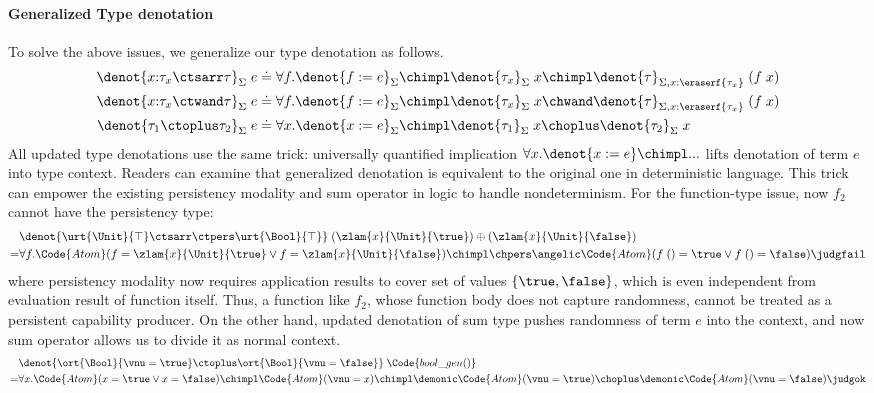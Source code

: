 \paragraph{Generalized Type denotation} To solve the above issues, we generalize our type denotation as follows.
\begin{align*}
  \denot{x{:}\tau_x \ctsarr \tau}_\Sigma\;e &\doteq \forall f. \denot{f := e}_\Sigma \chimpl \denot{\tau_x}_\Sigma\;x \chimpl \denot{\tau}_{\Sigma,x{:}\eraserf{\tau_x}}\;(f\;x)
  \\\denot{x{:}\tau_x \ctwand \tau}_\Sigma\;e &\doteq \forall f. \denot{f := e}_\Sigma \chimpl \denot{\tau_x}_\Sigma\;x \chwand \denot{\tau}_{\Sigma,x{:}\eraserf{\tau_x}}\;(f\;x)
  \\\denot{\tau_1 \ctoplus \tau_2}_\Sigma\;e &\doteq \forall x. \denot{x := e}_\Sigma \chimpl \denot{\tau_1}_\Sigma\;x \choplus \denot{\tau_2}_\Sigma\;x
\end{align*}\noindent
All updated type denotations use the same trick: universally quantified implication $\forall x. \denot{x := e} \chimpl ...$ lifts denotation of term $e$ into type context. Readers can examine that generalized denotation is equivalent to the original one in deterministic language.
This trick can empower the existing persistency modality and sum operator in logic to handle nondeterminism.
For the function-type issue, now $f_2$ cannot have the persistency type:
\begin{align*}
  &\denot{\urt{\Unit}{\top}\ctsarr\ctpers\urt{\Bool}{\top}}\;(\zlam{x}{\Unit}{\true}) \oplus (\zlam{x}{\Unit}{\false})
  \\=& \forall f. \Code{Atom}(f = \zlam{x}{\Unit}{\true} \lor f = \zlam{x}{\Unit}{\false}) \chimpl \chpers \angelic \Code{Atom}(f\;() = \true \lor f\;() = \false) \judgfail
\end{align*}\noindent
where persistency modality now requires application results to cover set of values $\{\true, \false\}$, which is even independent from evaluation result of function itself. Thus, a function like $f_2$, whose function body does not capture randomness, cannot be treated as a persistent capability producer. On the other hand, updated denotation of sum type pushes randomness of term $e$ into the context, and now sum operator allows us to divide it as normal context.
\begin{align*}
  &\denot{\ort{\Bool}{\vnu = \true} \ctoplus \ort{\Bool}{\vnu = \false}}\;\Code{bool\_gen()}
  \\=& \forall x. \Code{Atom}(x = \true \lor x = \false) \chimpl \Code{Atom}(\vnu = x) \chimpl \demonic\Code{Atom}(\vnu = \true) \choplus \demonic \Code{Atom}(\vnu = \false) \judgok
\end{align*}\noindent
